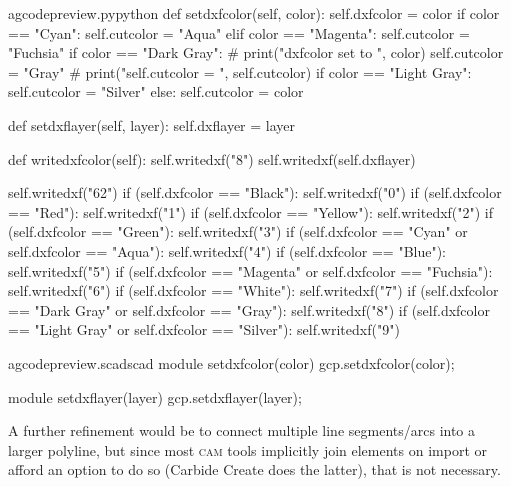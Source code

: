 \documentclass{ltxdoc}
\begin{document}
\lstset{firstnumber=\thegcpy}
\begin{writecode}{a}{gcodepreview.py}{python}
    def setdxfcolor(self, color):
        self.dxfcolor = color
        if color == "Cyan":
            self.cutcolor = "Aqua"
        elif color == "Magenta":
            self.cutcolor = "Fuchsia"
        if color == "Dark Gray":
#            print("dxfcolor set to ", color)
            self.cutcolor = "Gray"
#            print("self.cutcolor = ", self.cutcolor)
        if color == "Light Gray":
            self.cutcolor = "Silver"
        else:
            self.cutcolor = color

    def setdxflayer(self, layer):
        self.dxflayer = layer

    def writedxfcolor(self):
            self.writedxf("8")
            self.writedxf(self.dxflayer)

            self.writedxf("62")
            if (self.dxfcolor == "Black"):
                self.writedxf("0")
            if (self.dxfcolor == "Red"):
                self.writedxf("1")
            if (self.dxfcolor == "Yellow"):
                self.writedxf("2")
            if (self.dxfcolor == "Green"):
                self.writedxf("3")
            if (self.dxfcolor == "Cyan" or self.dxfcolor == "Aqua"):
                self.writedxf("4")
            if (self.dxfcolor == "Blue"):
                self.writedxf("5")
            if (self.dxfcolor == "Magenta" or self.dxfcolor == "Fuchsia"):
                self.writedxf("6")
            if (self.dxfcolor == "White"):
                self.writedxf("7")
            if (self.dxfcolor == "Dark Gray" or self.dxfcolor == "Gray"):
                self.writedxf("8")
            if (self.dxfcolor == "Light Gray" or self.dxfcolor == "Silver"):
                self.writedxf("9")

\end{writecode}
\addtocounter{gcpy}{44}

\lstset{firstnumber=\thegcpscad}
\begin{writecode}{a}{gcodepreview.scad}{scad}
module setdxfcolor(color){
    gcp.setdxfcolor(color);
}

module setdxflayer(layer){
    gcp.setdxflayer(layer);
}

\end{writecode}
\addtocounter{gcpscad}{8}

A further refinement would be to connect multiple line segments/arcs into a larger polyline, but since most \textsc{cam} tools implicitly join elements on import or afford an option to do so (Carbide Create does the latter), that is not necessary.
 
\end{document}
